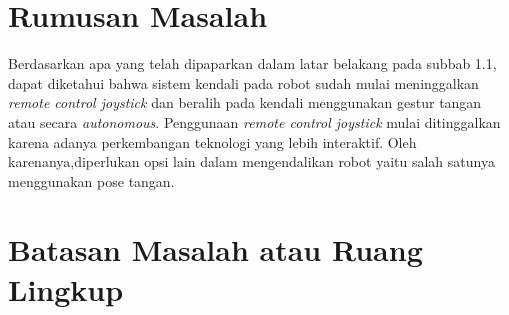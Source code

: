  


\section{Rumusan Masalah}
Berdasarkan apa yang telah dipaparkan dalam latar belakang pada subbab 1.1, dapat diketahui bahwa sistem kendali pada robot sudah mulai meninggalkan \textit{remote control joystick} dan beralih pada kendali menggunakan gestur tangan atau secara \textit{autonomous}. Penggunaan \textit{remote control joystick} mulai ditinggalkan karena adanya perkembangan teknologi yang lebih interaktif. Oleh karenanya,diperlukan opsi lain dalam mengendalikan robot yaitu salah satunya menggunakan pose tangan.



\section{Batasan Masalah atau Ruang Lingkup}

